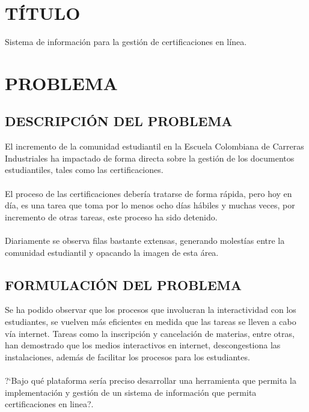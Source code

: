 \chapter{T\'ITULO}
%
Sistema de informaci\'on para la gesti\'on de certificaciones en l\'inea.\\%
%
\chapter{PROBLEMA}
\section{DESCRIPCI\'ON DEL PROBLEMA}
%
El incremento de la comunidad estudiantil en la Escuela Colombiana de Carreras Industriales ha impactado de forma directa sobre la gesti\'on de los documentos estudiantiles, tales como las certificaciones.\\%
%
\\El proceso de las certificaciones deber\'ia tratarse de forma r\'apida, pero hoy en d\'ia, es una tarea que toma por lo menos ocho d\'ias h\'abiles y muchas veces, por incremento de otras tareas, este proceso ha sido detenido.\\%
%
\\Diariamente se observa filas bastante extensas, generando molest\'ias entre la comunidad estudiantil y opacando la imagen de esta \'area.%
%
\section{FORMULACI\'ON DEL PROBLEMA}
%
Se ha podido observar que los procesos que involucran la interactividad con los estudiantes, se vuelven m\'as eficientes en medida que las tareas se lleven a cabo v\'ia internet. Tareas como la inscripci\'on y cancelaci\'on de materias, entre otras, han demostrado que los medios interactivos en internet, descongestiona las instalaciones, adem\'as de facilitar los procesos para los estudiantes.\\%
%
\\?`Bajo qu\'e plataforma ser\'ia preciso desarrollar una herramienta que permita la implementaci\'on y gesti\'on de un sistema de informaci\'on que permita certificaciones en linea?.%